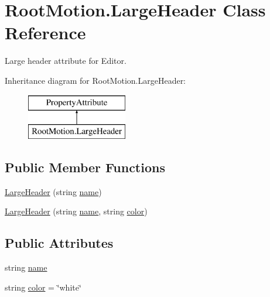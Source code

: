 \hypertarget{class_root_motion_1_1_large_header}{}\section{Root\+Motion.\+Large\+Header Class Reference}
\label{class_root_motion_1_1_large_header}


Large header attribute for Editor.  


Inheritance diagram for Root\+Motion.\+Large\+Header\+:\begin{figure}[H]
\begin{center}
\leavevmode
\includegraphics[height=2.000000cm]{class_root_motion_1_1_large_header}
\end{center}
\end{figure}
\subsection*{Public Member Functions}
\begin{DoxyCompactItemize}
\item 
\mbox{\hyperlink{class_root_motion_1_1_large_header_ac3fcac2a9a1f096a9205708efa60dc05}{Large\+Header}} (string \mbox{\hyperlink{class_root_motion_1_1_large_header_a8f861b25f68f4c63341d2f0470addad4}{name}})
\item 
\mbox{\hyperlink{class_root_motion_1_1_large_header_a337bf63bd9e31bdadcde4b46e566799b}{Large\+Header}} (string \mbox{\hyperlink{class_root_motion_1_1_large_header_a8f861b25f68f4c63341d2f0470addad4}{name}}, string \mbox{\hyperlink{class_root_motion_1_1_large_header_a14e8705d8aad81a28ae5cf9995c00967}{color}})
\end{DoxyCompactItemize}
\subsection*{Public Attributes}
\begin{DoxyCompactItemize}
\item 
string \mbox{\hyperlink{class_root_motion_1_1_large_header_a8f861b25f68f4c63341d2f0470addad4}{name}}
\item 
string \mbox{\hyperlink{class_root_motion_1_1_large_header_a14e8705d8aad81a28ae5cf9995c00967}{color}} = \char`\"{}white\char`\"{}
\end{DoxyCompactItemize}


